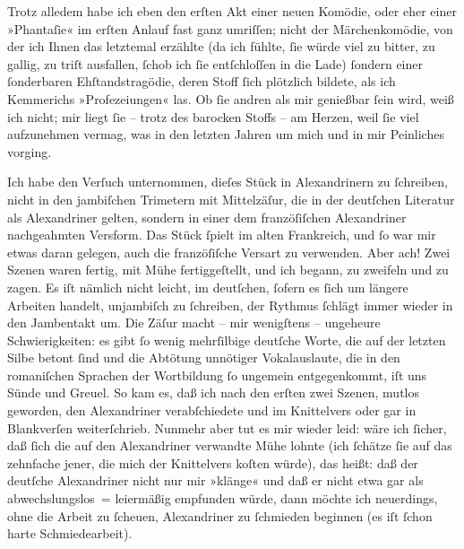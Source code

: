 \pstart
           Trotz alledem habe ich eben den erſten Akt einer neuen Komödie, oder eher einer
               »Phantaſie« im erſten Anlauf fast ganz umriſſen; nicht der Märchenkomödie, von der ich Ihnen das
               letztemal erzählte (da ich fühlte, ſie würde viel zu bitter, zu gallig, zu triſt
               ausfallen, ſchob ich ſie entſchloſſen in die Lade) ſondern einer ſonderbaren Ehſtandstragödie, deren Stoff
               ſich plötzlich bildete, als ich Kemmerichs
                  »Profezeiungen« las. Ob ſie andren als mir
               genießbar ſein wird, weiß ich nicht; mir liegt ſie – trotz des ba{\pb}rocken Stoffs – am Herzen, weil ſie viel aufzunehmen
               vermag, was in den letzten Jahren um mich und in mir Peinliches vorging.\pend
           
\pstart
           Ich habe den Verſuch unternommen, dieſes Stück in Alexandrinern zu ſchreiben, nicht
               in den jambiſchen Trimetern mit Mittelzäſur, die in der deutſchen Literatur als
               Alexandriner gelten, sondern in einer dem franzöſiſchen Alexandriner nachgeahmten Versform. Das Stück ſpielt im alten
                  Frankreich, und ſo war mir etwas daran
               gelegen, auch die franzöſiſche Versart zu
               verwenden. Aber ach! Zwei Szenen waren fertig, mit Mühe fertiggeſtellt, und ich
               begann, zu zweifeln und zu zagen. Es iſt nämlich nicht leicht, im deutſchen, ſofern
               es ſich um längere Arbeiten handelt, unjambiſch zu ſchreiben, der Rythmus ſchlägt
               immer wieder in den Jambentakt um. Die Zäſur macht – mir wenigſtens – ungeheure
               Schwierigkeiten: es gibt ſo wenig 
               mehrſilbige deutſche Worte, die auf der letzten Silbe betont {\pb}ſind und die Abtötung unnötiger Vokalauslaute, die in
               den romaniſchen Sprachen der Wortbildung ſo ungemein entgegenkommt, iſt uns Sünde und Greuel. So kam es, daß ich nach
               den erſten zwei Szenen, mutlos geworden, den Alexandriner verabſchiedete und im
               Knittelvers oder gar in Blankverſen weiterſchrieb. Nunmehr aber tut es mir wieder
               leid: wäre ich ſicher, daß ſich die auf den Alexandriner verwandte Mühe lohnte (ich
               ſchätze ſie auf das zehnfache jener, die mich der Knittelvers koſten würde), das
               heißt: daß der deutſche Alexandriner nicht nur mir »klänge« und daß er nicht etwa gar
               als abwechslungslos = leiermäßig empfunden würde, dann möchte ich neuerdings, ohne
               die Arbeit zu ſcheuen, Alexandriner zu ſchmieden beginnen (es iſt ſchon harte
               Schmiedearbeit).\pend
           
